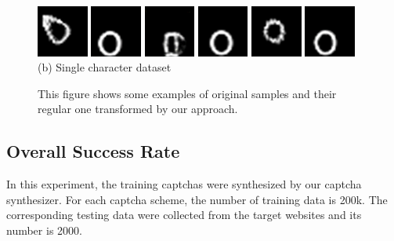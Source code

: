 \begin{figure}
{\begin{minipage}[t]{0.45\textwidth}
        \includegraphics[width=0.15\textwidth]{fig/experiment_onechar/o-1.png}
        \includegraphics[width=0.15\textwidth]{fig/experiment_onechar/o-2.png}
        \includegraphics[width=0.15\textwidth]{fig/experiment_onechar/o-7.png}
        \includegraphics[width=0.15\textwidth]{fig/experiment_onechar/o-8.png}
        \includegraphics[width=0.15\textwidth]{fig/experiment_onechar/o-13.png}
        \includegraphics[width=0.15\textwidth]{fig/experiment_onechar/o-14.png} \\
        \centering (b) Single character dataset
    \end{minipage}
    }
  \caption{This figure shows some examples of original samples and their regular one transformed by our approach.}
  \label{fig: mnist_show}
\end{figure}

\subsection{Overall Success Rate}
In this experiment, the training captchas were synthesized by our captcha synthesizer. For each captcha scheme, the number of training data is 200k. The corresponding testing data were collected from the target websites and its number is 2000.
